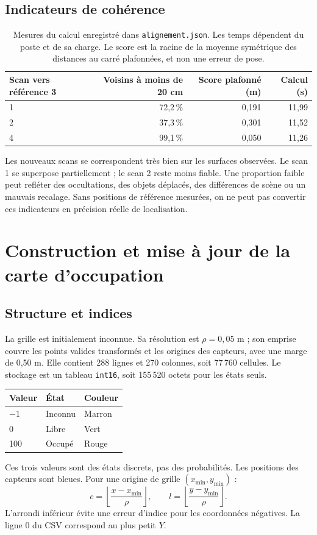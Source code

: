 \documentclass[11pt,a4paper]{article}
\begin{document}
\subsection{Indicateurs de cohérence}
\begin{table}[H]\centering
\begin{tabular}{lrrr}\toprule Scan vers référence 3 & Voisins à moins de 20 cm & Score plafonné (m) & Calcul (s) \\
\midrule
1 & 72,2\,\% & 0,191 & 11,99 \\
2 & 37,3\,\% & 0,301 & 11,52 \\
4 & 99,1\,\% & 0,050 & 11,26 \\
\bottomrule\end{tabular}
\caption{Mesures du calcul enregistré dans \texttt{alignement.json}. Les temps dépendent du poste et de sa charge. Le score est la racine de la moyenne symétrique des distances au carré plafonnées, et non une erreur de pose.}
\end{table}
Les nouveaux scans se correspondent très bien sur les surfaces observées. Le scan 1 se superpose partiellement ; le scan 2 reste moins fiable. Une proportion faible peut refléter des occultations, des objets déplacés, des différences de scène ou un mauvais recalage. Sans positions de référence mesurées, on ne peut pas convertir ces indicateurs en précision réelle de localisation.

\section{Construction et mise à jour de la carte d'occupation}
\subsection{Structure et indices}
La grille est initialement inconnue. Sa résolution est $\rho=0{,}05$ m ; son emprise couvre les points valides transformés et les origines des capteurs, avec une marge de 0,50 m. Elle contient 288 lignes et 270 colonnes, soit 77\,760 cellules. Le stockage est un tableau \texttt{int16}, soit 155\,520 octets pour les états seuls.
\begin{center}\begin{tabular}{lll}\toprule Valeur & État & Couleur \\
\midrule $-1$ & Inconnu & Marron \\ 0 & Libre & Vert \\ 100 & Occupé & Rouge \\
\bottomrule\end{tabular}\end{center}
Ces trois valeurs sont des états discrets, pas des probabilités. Les positions des capteurs sont bleues. Pour une origine de grille $(x_{\min},y_{\min})$ :
\[
 c=\left\lfloor\frac{x-x_{\min}}{\rho}\right\rfloor,\qquad
 l=\left\lfloor\frac{y-y_{\min}}{\rho}\right\rfloor.
\]
L'arrondi inférieur évite une erreur d'indice pour les coordonnées négatives. La ligne 0 du CSV correspond au plus petit $Y$.
\end{document}
